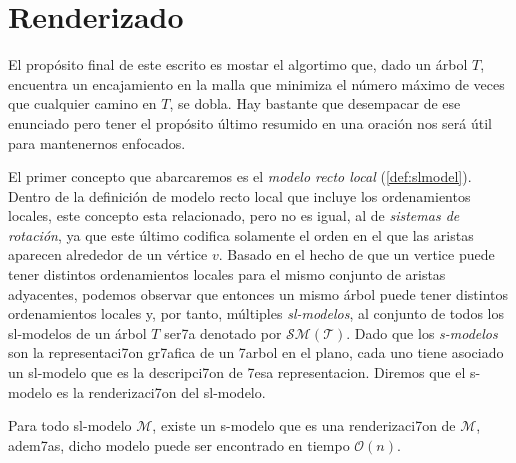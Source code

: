 
\chapter{Renderizado}
\label{ch:introduction}


El propósito final de este escrito es mostar el algortimo que, dado un árbol $T$, encuentra un encajamiento en la malla que minimiza el número máximo de veces que cualquier camino en $T$, se dobla. Hay bastante que desempacar de ese enunciado pero tener el propósito último resumido en una oración nos será útil para mantenernos enfocados.


El primer concepto que abarcaremos es el \textit{modelo recto local} (\ref{def:slmodel}). Dentro de la definición de modelo recto local que incluye los ordenamientos locales, este concepto esta relacionado, pero no es igual, al de \textit{sistemas de rotaci\'on}, ya que este \'ultimo codifica solamente el orden en el que las aristas aparecen alrededor de un v\'ertice $v$. Basado en el hecho de que un vertice puede tener distintos ordenamientos locales para el mismo conjunto de aristas adyacentes, podemos observar que entonces un mismo árbol puede tener distintos ordenamientos locales y, por tanto, múltiples \textit{sl-modelos}, al conjunto de todos los sl-modelos de un árbol $T$ ser7a denotado por $\mathcal{SM(T)}$. Dado que los \textit{s-modelos} son la representaci7on gr7afica de un 7arbol en el plano, cada uno tiene asociado un sl-modelo que es la descripci7on de 7esa representacion. Diremos que el s-modelo es la renderizaci7on del sl-modelo.


\begin{lemma}
    Para todo sl-modelo $\mathcal{M}$, existe un s-modelo que es una renderizaci7on de $\mathcal{M}$, adem7as, dicho modelo puede ser encontrado en tiempo $\mathcal{O}(n)$.
\end{lemma}